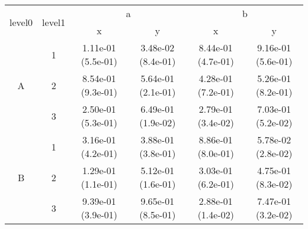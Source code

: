 \begin{tabular}{cccccc}
\toprule
\multirow{2}{*}{level0} & \multirow{2}{*}{level1}&\multicolumn{2}{c}{a}&\multicolumn{2}{c}{b}\tabularnewline
\cmidrule(lr){3-4}
\cmidrule(lr){5-6}
&&x&y&x&y\tabularnewline
\midrule
\multirow{3}{*}{A}&1& 1.11e-01 (5.5e-01)& 3.48e-02 (8.4e-01)& 8.44e-01 (4.7e-01)& 9.16e-01 (5.6e-01)\tabularnewline
&2& 8.54e-01 (9.3e-01)& 5.64e-01 (2.1e-01)& 4.28e-01 (7.2e-01)& 5.26e-01 (8.2e-01)\tabularnewline
&3& 2.50e-01 (5.3e-01)& 6.49e-01 (1.9e-02)& 2.79e-01 (3.4e-02)& 7.03e-01 (5.2e-02)\tabularnewline
\midrule
\multirow{3}{*}{B}&1& 3.16e-01 (4.2e-01)& 3.88e-01 (3.8e-01)& 8.86e-01 (8.0e-01)& 5.78e-02 (2.8e-02)\tabularnewline
&2& 1.29e-01 (1.1e-01)& 5.12e-01 (1.6e-01)& 3.03e-01 (6.2e-01)& 4.75e-01 (8.3e-02)\tabularnewline
&3& 9.39e-01 (3.9e-01)& 9.65e-01 (8.5e-01)& 2.88e-01 (1.4e-02)& 7.47e-01 (3.2e-02)\tabularnewline
\bottomrule
\end{tabular}
